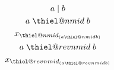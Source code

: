 \documentclass{article}
\makeatletter
\providecommand{\nmid}{}
\providecommand{\revnmid}{}
\renewcommand\nmid{\mathrel{\mathpalette\thiel@nmid\relax}}
\newcommand{\thiel@nmid}[2]{%
  \ooalign{%
    \hidewidth\rotatebox[origin=c]{40}{$\m@th#1-$}\hidewidth\cr
    $\m@th#1|$\cr}%
}
\renewcommand\revnmid{\mathrel{\mathpalette\thiel@revnmid\relax}}
\newcommand{\thiel@revnmid}[2]{%
  \ooalign{%
    \hidewidth\rotatebox[origin=c]{-40}{$\m@th#1-$}\hidewidth\cr
    $\m@th#1|$\cr}%
}
\makeatother
\begin{document}
\begin{gather*}
a\mid b\\
a\nmid b\\
x_{\nmid_{(a\nmid b)}}\\
a\revnmid b\\
x_{\revnmid_{(a\revnmid b)}}
\end{gather*}
\end{document}
